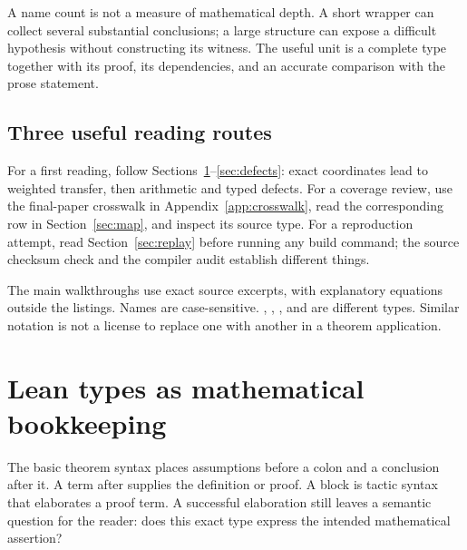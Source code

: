 A name count is not a measure of mathematical depth. A short wrapper can collect several substantial conclusions; a large structure can expose a difficult hypothesis without constructing its witness. The useful unit is a complete type together with its proof, its dependencies, and an accurate comparison with the prose statement.

\subsection{Three useful reading routes}

For a first reading, follow Sections~\ref{sec:types}--\ref{sec:defects}: exact coordinates lead to weighted transfer, then arithmetic and typed defects. For a coverage review, use the final-paper crosswalk in Appendix~\ref{app:crosswalk}, read the corresponding row in Section~\ref{sec:map}, and inspect its source type. For a reproduction attempt, read Section~\ref{sec:replay} before running any build command; the source checksum check and the compiler audit establish different things.

The main walkthroughs use exact source excerpts, with explanatory equations outside the listings. Names are case-sensitive. , , , and  are different types. Similar notation is not a license to replace one with another in a theorem application.

\section{Lean types as mathematical bookkeeping}\label{sec:types}

The basic theorem syntax places assumptions before a colon and a conclusion after it. A term after \code{:=} supplies the definition or proof. A  block is tactic syntax that elaborates a proof term. A successful elaboration still leaves a semantic question for the reader: does this exact type express the intended mathematical assertion?

